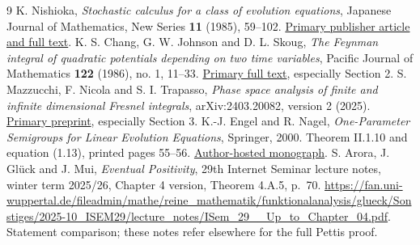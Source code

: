\documentclass[11pt]{article}
\theoremstyle{remark}\newtheorem{remark}[theorem]{Remark}
\begin{document}
\begin{thebibliography}{9}
 K. Nishioka, \emph{Stochastic calculus for a class of evolution equations}, Japanese Journal of Mathematics, New Series \textbf{11} (1985), 59--102. \href{https://www.jstage.jst.go.jp/article/math1924/11/1/11_1_59/_article/-char/en}{Primary publisher article and full text}.
 K. S. Chang, G. W. Johnson and D. L. Skoug, \emph{The Feynman integral of quadratic potentials depending on two time variables}, Pacific Journal of Mathematics \textbf{122} (1986), no. 1, 11--33. \href{https://msp.org/pjm/1986/122-1/pjm-v122-n1-p02-s.pdf}{Primary full text}, especially Section 2.
 S. Mazzucchi, F. Nicola and S. I. Trapasso, \emph{Phase space analysis of finite and infinite dimensional Fresnel integrals}, arXiv:2403.20082, version 2 (2025). \href{https://arxiv.org/pdf/2403.20082}{Primary preprint}, especially Section 3.
 K.-J. Engel and R. Nagel,
\emph{One-Parameter Semigroups for Linear Evolution Equations},
Springer, 2000. Theorem II.1.10 and equation (1.13), printed pages 55--56.
\href{https://www.math.uni-tuebingen.de/de/forschung/agfa/members/engel-nagel_one-parameter-semigroups.pdf}{Author-hosted monograph}.
 S. Arora, J. Gl\"uck and J. Mui,
\emph{Eventual Positivity}, 29th Internet Seminar lecture notes,
winter term 2025/26, Chapter 4 version, Theorem 4.A.5, p.~70.
\url{https://fan.uni-wuppertal.de/fileadmin/mathe/reine_mathematik/funktionalanalysis/glueck/Sonstiges/2025-10_ISEM29/lecture_notes/ISem_29__Up_to_Chapter_04.pdf}.
Statement comparison; these notes refer elsewhere for the full Pettis proof.
\end{thebibliography}
\end{document}
